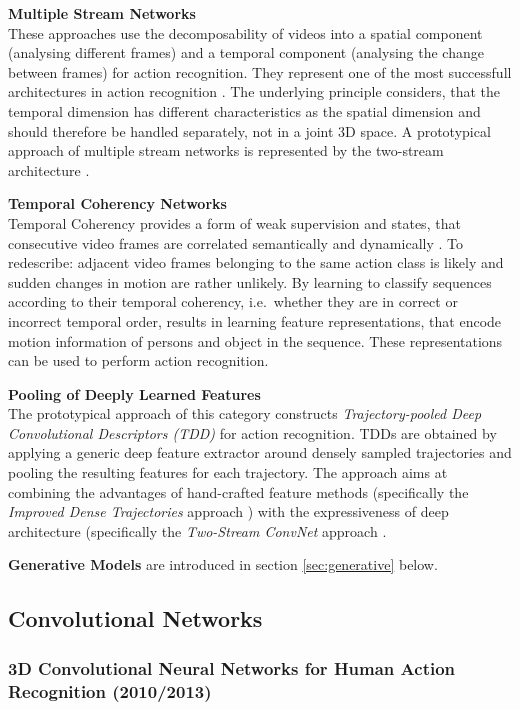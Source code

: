 \textbf{Multiple Stream Networks}\\
These approaches use the decomposability of videos into a spatial component (analysing different frames) and a temporal component (analysing the change between frames) for action recognition.
They represent one of the most successfull architectures in action recognition \cite{wang_action_2015}.
The underlying principle considers, that the temporal dimension has different characteristics as the spatial dimension and should therefore be handled separately, not in a joint 3D space.
A prototypical approach of multiple stream networks is represented by the two-stream architecture \cite{simonyan_two-stream_2014}.

\textbf{Temporal Coherency Networks}\\
Temporal Coherency provides a form of weak supervision and states, that consecutive video frames are correlated semantically and dynamically \cite{herath_going_2016}.
To redescribe: adjacent video frames belonging to the same action class is likely and sudden changes in motion are rather unlikely.
By learning to classify sequences according to their temporal coherency, i.e.\ whether they are in correct or incorrect temporal order, results in learning feature representations, that encode motion information of persons and object in the sequence.
These representations can be used to perform action recognition.

\textbf{Pooling of Deeply Learned Features}\\
The prototypical approach of this category constructs \textit{Trajectory-pooled Deep Convolutional Descriptors (TDD)} \cite{wang_action_2015} for action recognition.
TDDs are obtained by applying a generic deep feature extractor around densely sampled trajectories and pooling the resulting features for each trajectory.
The approach aims at combining the advantages of hand-crafted feature methods (specifically the \textit{Improved Dense Trajectories} approach \cite{wang_action_2013}) with the expressiveness of deep architecture (specifically the \textit{Two-Stream ConvNet} approach \cite{simonyan_two-stream_2014}.

\textbf{Generative Models} are introduced in section \ref{sec:generative} below.

\subsection{Convolutional Networks}

\subsubsection{3D Convolutional Neural Networks for Human Action Recognition (2010/2013)}


